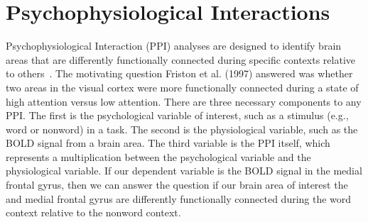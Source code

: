 \documentclass[phd,figures,tables,ackpage,abstractpage,publicabstractpage]{uithesis}
\begin{document}
\section{Psychophysiological Interactions}

Psychophysiological Interaction (PPI) analyses are designed to 
identify brain areas that are differently functionally connected
during specific contexts relative to others~\cite{Friston1997}.
The motivating question Friston et al. (1997) answered was whether
two areas in the visual cortex were more functionally connected during a state
of high attention versus low attention.
There are three necessary components to any PPI.
The first is the psychological variable of interest, such as a stimulus (e.g., word or nonword)
in a task.
The second is the physiological variable, such as the BOLD signal from
a brain area.
The third variable is the PPI itself, which represents a multiplication
between the psychological variable and the physiological variable.
If our dependent variable is the BOLD signal in the medial frontal gyrus,
then we can answer the question if our brain area of interest the and medial frontal gyrus
are differently functionally connected during the word context relative
to the nonword context.
\end{document}
